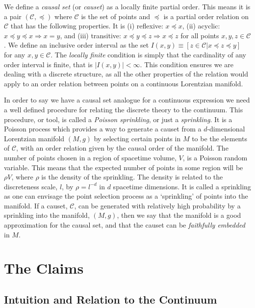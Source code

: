 \documentclass[12pt]{article}
\begin{document}
We define a \textit{causal set} (or \textit{causet}) as a locally finite partial order. This means it is a pair $ (\mathcal{C},\preceq)$ where $\mathcal{C}$ is the set of points and $\preceq$ is a partial order relation on $\mathcal{C}$ that has the following properties. It is (i) reflexive: $x\preceq x$, (ii) acyclic: $x\preceq y\preceq x \Rightarrow x=y$, and (iii) transitive: $x\preceq y\preceq z \Rightarrow x\preceq z$ for all points $x, y, z \in \mathcal{C}$. We define an inclusive order interval as the set $I (x,y)\equiv [ z\in\mathcal{C}|x\preceq z\preceq y]$ for any $x, y\in\mathcal{C}$. The \textit{locally finite} condition is simply that the cardinality of any order interval is finite, that is $|I (x,y)|<\infty$. This condition ensures we are dealing with a discrete structure, as all the other properties of the relation would apply to an order relation between points on a continuous Lorentzian manifold.

In order to say we have a causal set analogue for a continuous expression we need a well defined procedure for relating the discrete theory to the continuum. This procedure, or tool, is called a \textit{Poisson sprinkling}, or just a \textit{sprinkling}. It is a Poisson process which provides a way to generate a causet from a $d$-dimensional Lorentzian manifold $ (M,g)$ by selecting certain points in $M$ to be the elements of $\mathcal{C}$, with an order relation given by the causal order of the manifold. The number of points chosen in a region of spacetime volume, $V$, is a Poisson random variable. This means that the expected number of points in some region will be $\rho V$, where $\rho$ is the density of the sprinkling. The density is related to the discreteness scale, $l$, by $\rho=l^{-d}$ in $d$ spacetime dimensions. It is called a sprinkling as one can envisage the point selection process as a `sprinkling' of points into the manifold. If a causet, $\mathcal{C}$, can be generated with relatively high probability by a sprinkling into the manifold, $ (M,g)$, then we say that the manifold is a good approximation for the causal set, and that the causet can be \emph{faithfully embedded} in $M$.

\section{The Claims}

\subsection{Intuition and Relation to the Continuum}
\end{document}
